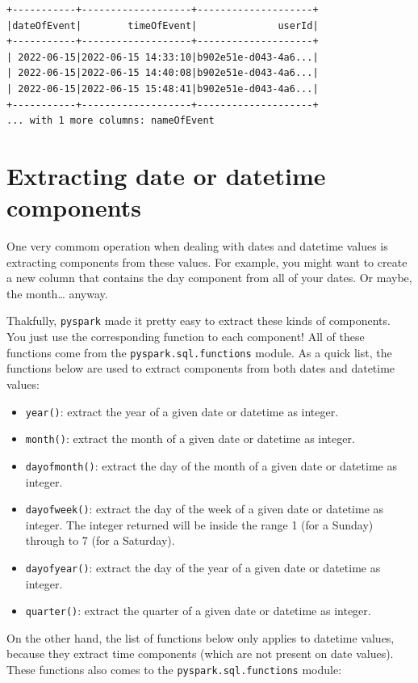\documentclass[
  11pt,
  letterpaper,
  DIV=11,
  numbers=noendperiod]{scrreprt}
\providecommand{\tightlist}{%
  \setlength{\itemsep}{0pt}\setlength{\parskip}{0pt}}\usepackage{longtable,booktabs,array}
\begin{document}
\begin{verbatim}
+-----------+-------------------+--------------------+
|dateOfEvent|        timeOfEvent|              userId|
+-----------+-------------------+--------------------+
| 2022-06-15|2022-06-15 14:33:10|b902e51e-d043-4a6...|
| 2022-06-15|2022-06-15 14:40:08|b902e51e-d043-4a6...|
| 2022-06-15|2022-06-15 15:48:41|b902e51e-d043-4a6...|
+-----------+-------------------+--------------------+
... with 1 more columns: nameOfEvent
\end{verbatim}

\section{Extracting date or datetime
components}\label{extracting-date-or-datetime-components}

One very commom operation when dealing with dates and datetime values is
extracting components from these values. For example, you might want to
create a new column that contains the day component from all of your
dates. Or maybe, the month\ldots{} anyway.

Thakfully, \texttt{pyspark} made it pretty easy to extract these kinds
of components. You just use the corresponding function to each
component! All of these functions come from the
\texttt{pyspark.sql.functions} module. As a quick list, the functions
below are used to extract components from both dates and datetime
values:

\begin{itemize}
\tightlist
\item
  \texttt{year()}: extract the year of a given date or datetime as
  integer.
\item
  \texttt{month()}: extract the month of a given date or datetime as
  integer.
\item
  \texttt{dayofmonth()}: extract the day of the month of a given date or
  datetime as integer.
\item
  \texttt{dayofweek()}: extract the day of the week of a given date or
  datetime as integer. The integer returned will be inside the range 1
  (for a Sunday) through to 7 (for a Saturday).
\item
  \texttt{dayofyear()}: extract the day of the year of a given date or
  datetime as integer.
\item
  \texttt{quarter()}: extract the quarter of a given date or datetime as
  integer.
\end{itemize}

On the other hand, the list of functions below only applies to datetime
values, because they extract time components (which are not present on
date values). These functions also comes to the
\texttt{pyspark.sql.functions} module:
\end{document}
